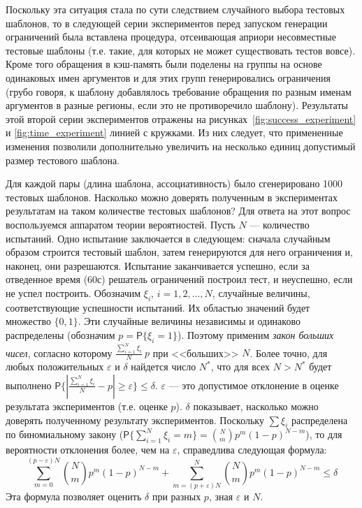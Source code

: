 Поскольку эта ситуация стала по сути следствием случайного выбора тестовых
шаблонов, то в следующей серии экспериментов перед запуском генерации
ограничений была вставлена процедура, отсеивающая априори несовместные тестовые
шаблоны (т.е. такие, для которых не может существовать тестов вовсе). Кроме того
обращения в кэш-память были поделены на группы на основе одинаковых имен
аргументов и для этих групп генерировались ограничения (грубо говоря, к шаблону
добавлялось требование обращения по разным именам аргументов в разные регионы,
если это не противоречило шаблону). Результаты этой второй серии экспериментов
отражены на рисунках~\ref{fig:success_experiment} и \ref{fig:time_experiment}
линией с кружками. Из них следует, что примененные изменения позволили
дополнительно увеличить на несколько единиц допустимый размер тестового шаблона.

Для каждой пары (длина шаблона, ассоциативность) было сгенерировано 1000
тестовых шаблонов. Насколько можно доверять полученным в экспериментах
результатам на таком количестве тестовых шаблонов? Для ответа на этот вопрос воспользуемся аппаратом теории
вероятностей. Пусть $N$ --- количество испытаний. Одно испытание заключается в
следующем: сначала случайным образом строится тестовый шаблон, затем генерируются
для него ограничения и, наконец, они разрешаются. Испытание заканчивается успешно, если за отведенное время (60с) решатель ограничений построил тест, и неуспешно, если не успел построить.
Обозначим  $\xi_i$, $i = 1, 2, \dots, N$, случайные величины, соответствующие
успешности испытаний. Их областью значений будет множество $\{0, 1\}$. Эти
случайные величины независимы и одинаково распределены (обозначим $p =
\mathsf{P}\{\xi_i = 1\}$). Поэтому применим \emph{закон больших чисел}, согласно
которому $\frac{\sum_{i=1}^N \xi_i}{N} ~ p$ при <<больших>> $N$. Более точно, для любых
положительных $\varepsilon$ и $\delta$ найдется число $N^*$, что для всех $N > N^*$ будет
выполнено $\mathsf{P}\{|\frac{\sum_{i=1}^N \xi_i}{N} - p | \geq \varepsilon\} \leq \delta$. $\varepsilon$ --- это допустимое отклонение в оценке результата экспериментов (т.е. оценке $p$). $\delta$ показывает, насколько можно доверять полученному результату экспериментов. Поскольку $\sum \xi_i$ распределена по биномиальному закону ($\mathsf{P}\{\sum_{i=1}^N \xi_i = m\} = \binom{N}{m} p^m (1{-}p)^{N{-}m}$), то для вероятности отклонения более, чем на $\varepsilon$, справедлива следующая формула: $$\sum_{m = 0}^{(p-\varepsilon)N} \binom{N}{m} p^m (1{-}p)^{N{-}m} + \sum_{m = (p+\varepsilon)N}^N \binom{N}{m} p^m (1{-}p)^{N{-}m} \leq \delta$$ Эта формула позволяет оценить $\delta$ при разных $p$, зная $\varepsilon$ и $N$.

